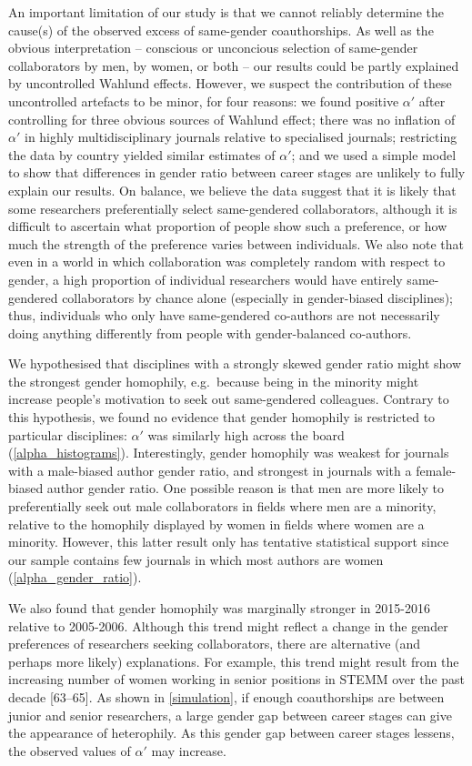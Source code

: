 \documentclass[12pt,]{article}
\begin{document}
An important limitation of our study is that we cannot reliably
determine the cause(s) of the observed excess of same-gender
coauthorships. As well as the obvious interpretation -- conscious or
unconcious selection of same-gender collaborators by men, by women, or
both -- our results could be partly explained by uncontrolled Wahlund
effects. However, we suspect the contribution of these uncontrolled
artefacts to be minor, for four reasons: we found positive \(\alpha'\)
after controlling for three obvious sources of Wahlund effect; there was
no inflation of \(\alpha'\) in highly multidisciplinary journals
relative to specialised journals; restricting the data by country
yielded similar estimates of \(\alpha'\); and we used a simple model to
show that differences in gender ratio between career stages are unlikely
to fully explain our results. On balance, we believe the data suggest
that it is likely that some researchers preferentially select
same-gendered collaborators, although it is difficult to ascertain what
proportion of people show such a preference, or how much the strength of
the preference varies between individuals. We also note that even in a
world in which collaboration was completely random with respect to
gender, a high proportion of individual researchers would have entirely
same-gendered collaborators by chance alone (especially in gender-biased
disciplines); thus, individuals who only have same-gendered co-authors
are not necessarily doing anything differently from people with
gender-balanced co-authors.

We hypothesised that disciplines with a strongly skewed gender ratio
might show the strongest gender homophily, e.g.~because being in the
minority might increase people's motivation to seek out same-gendered
colleagues. Contrary to this hypothesis, we found no evidence that
gender homophily is restricted to particular disciplines: \(\alpha'\)
was similarly high across the board (\autoref{alpha_histograms}).
Interestingly, gender homophily was weakest for journals with a
male-biased author gender ratio, and strongest in journals with a
female-biased author gender ratio. One possible reason is that men are
more likely to preferentially seek out male collaborators in fields
where men are a minority, relative to the homophily displayed by women
in fields where women are a minority. However, this latter result only
has tentative statistical support since our sample contains few journals
in which most authors are women (\autoref{alpha_gender_ratio}).

We also found that gender homophily was marginally stronger in 2015-2016
relative to 2005-2006. Although this trend might reflect a change in the
gender preferences of researchers seeking collaborators, there are
alternative (and perhaps more likely) explanations. For example, this
trend might result from the increasing number of women working in senior
positions in STEMM over the past decade {[}63--65{]}. As shown in
\autoref{simulation}, if enough coauthorships are between junior and
senior researchers, a large gender gap between career stages can give
the appearance of heterophily. As this gender gap between career stages
lessens, the observed values of \(\alpha'\) may increase.
\end{document}
